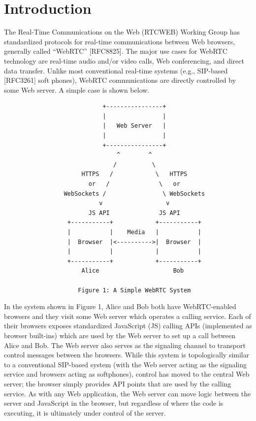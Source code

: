 \documentclass{article}
\begin{document}
\tableofcontents
\newpage

\section{Introduction}

The Real-Time Communications on the Web (RTCWEB) Working Group has
standardized protocols for real-time communications between Web
browsers, generally called ``WebRTC'' [RFC8825].  The major use cases
for WebRTC technology are real-time audio and/or video calls, Web
conferencing, and direct data transfer.  Unlike most conventional
real-time systems (e.g., SIP-based [RFC3261] soft phones), WebRTC
communications are directly controlled by some Web server.  A simple
case is shown below.

\begin{verbatim}
                            +----------------+
                            |                |
                            |   Web Server   |
                            |                |
                            +----------------+
                                ^        ^
                               /          \
                      HTTPS   /            \   HTTPS
                        or   /              \   or
                 WebSockets /                \ WebSockets
                           v                  v
                        JS API              JS API
                  +-----------+            +-----------+
                  |           |    Media   |           |
                  |  Browser  |<---------->|  Browser  |
                  |           |            |           |
                  +-----------+            +-----------+
                      Alice                     Bob

                     Figure 1: A Simple WebRTC System
\end{verbatim}

In the system shown in Figure 1, Alice and Bob both have WebRTC-enabled
browsers and they visit some Web server which operates a calling service.
Each of their browsers exposes standardized JavaScript (JS) calling APIs
(implemented as browser built-ins) which are used by the Web server to
set up a call between Alice and Bob.  The Web server also serves as the
signaling channel to transport control messages between the browsers.
While this system is topologically similar to a conventional SIP-based
system (with the Web server acting as the signaling service and browsers
acting as softphones), control has moved to the central Web server; the
browser simply provides API points that are used by the calling service.
As with any Web application, the Web server can move logic between the
server and JavaScript in the browser, but regardless of where the code
is executing, it is ultimately under control of the server.
\end{document}
